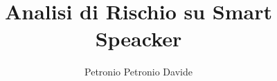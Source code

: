 \documentclass[12pt,a4paper,openany,oneside]{book}
\begin{document}


\title{Analisi di Rischio su Smart Speacker}
\author{Petronio Petronio Davide}


\tableofcontents











%
\end{document}
